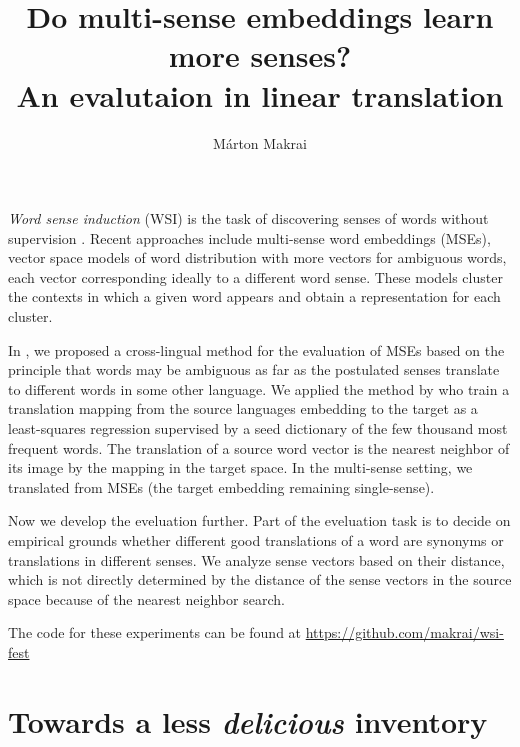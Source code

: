 \documentclass[11pt]{article}
\title{Do multi-sense embeddings learn more senses? \\ An evalutaion in linear
translation}
\author{
  Márton Makrai
}
\date{}
\begin{document}
\maketitle



\emph{Word sense induction} (WSI) is the task of discovering senses of words
without supervision \citep{Schutze:1998}. Recent approaches include multi-sense
word embeddings (MSEs), vector space models of word distribution with more
vectors for ambiguous words, each vector corresponding ideally to a different
word sense. These models cluster the contexts in which a given word appears and
obtain a representation for each cluster.

In \cite{Borbely:2016}, we proposed a cross-lingual method for the evaluation
of MSEs based on the principle that words may be ambiguous as far as the
postulated senses translate to different words in some other language.  We
applied the method by \citet{Mikolov:2013x} who train a translation mapping
from the source languages embedding to the target as a least-squares regression
supervised by a seed dictionary of the  few thousand most frequent words. The
translation of a source word vector is the nearest neighbor of its image by the
mapping in the target space. In the multi-sense setting, we translated from
MSEs (the target embedding remaining single-sense).

Now we develop the eveluation further. Part of the eveluation task is to decide
on empirical grounds whether different good translations of a word are synonyms
or translations in different senses.  We analyze sense vectors based on their
distance, which is not directly determined by the distance of the sense vectors
in the source space because of the nearest neighbor search.

The code for these experiments can be found at
\url{https://github.com/makrai/wsi-fest}

\section{Towards a less \emph{delicious} inventory}
\end{document}
